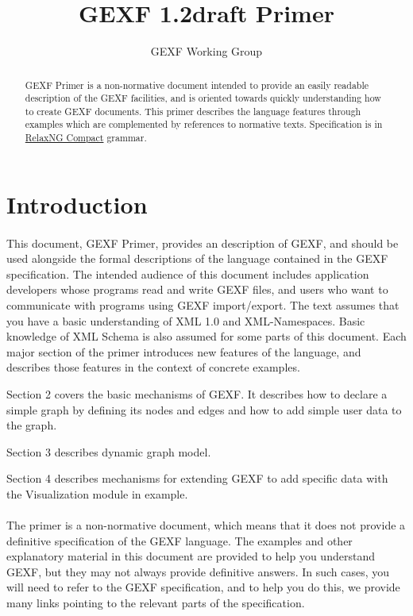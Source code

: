 \documentclass[a4paper,10pt]{article}
\title{GEXF 1.2draft Primer}
\author{GEXF Working Group}
\begin{document}
\maketitle

\begin{abstract}
GEXF Primer is a non-normative document intended to provide an easily readable description of the GEXF facilities, and is oriented towards quickly understanding how to create GEXF documents. This primer describes the language features through examples which are complemented by references to normative texts. Specification is in \href{http://relaxng.org/compact-tutorial-20030326.html}{RelaxNG Compact} grammar.
\end{abstract}

\tableofcontents

\section{Introduction} \label{introduction}

\paragraph{}
This document, GEXF Primer, provides an description of GEXF, and should be used alongside the formal descriptions of the language contained in the GEXF specification. The intended audience of this document includes application developers whose programs read and write GEXF files, and users who want to communicate with programs using GEXF import/export. The text assumes that you have a basic understanding of XML 1.0 and  XML-Namespaces. Basic knowledge of XML Schema is also assumed for some parts of this document. Each major section of the primer introduces new features of the language, and describes those features in the context of concrete examples.

Section 2 covers the basic mechanisms of GEXF. It describes how to declare a simple graph by defining its nodes and edges and how to add simple user data to the graph.

Section 3 describes dynamic graph model.

Section 4 describes mechanisms for extending GEXF to add specific data with the Visualization module in example.

\paragraph{}
The primer is a non-normative document, which means that it does not provide a definitive specification of the GEXF language. The examples and other explanatory material in this document are provided to help you understand GEXF, but they may not always provide definitive answers. In such cases, you will need to refer to the GEXF specification, and to help you do this, we provide many links pointing to the relevant parts of the specification.
\end{document}
